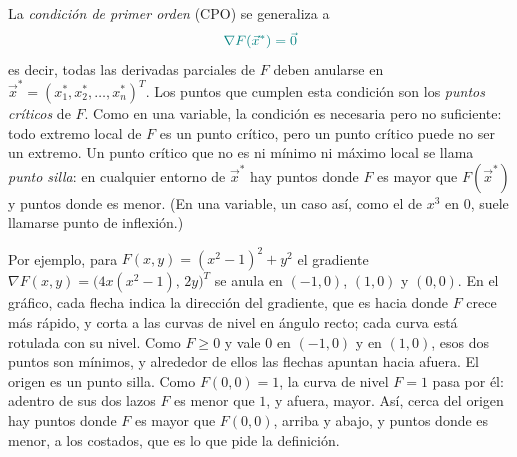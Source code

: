 \documentclass{article}
\newcommand{\vect}[1]{\vec{#1}}
\begin{document}
La \emph{condición de primer orden} (CPO) se generaliza a
\[\color{teal}
\nabla F(\vect{x}^*) = \vect{0}
\]
es decir, todas las derivadas parciales de \(F\) deben anularse en \(\vect{x}^* = (x^*_{1}, x^*_{2}, \dots, x^*_{n})^T\). Los puntos que cumplen esta condición son los \emph{puntos críticos} de \(F\). Como en una variable, la condición es necesaria pero no suficiente: todo extremo local de \(F\) es un punto crítico, pero un punto crítico puede no ser un extremo. Un punto crítico que no es ni mínimo ni máximo local se llama \emph{punto silla}: en cualquier entorno de \(\vect{x}^*\) hay puntos donde \(F\) es mayor que \(F(\vect{x}^*)\) y puntos donde es menor. (En una variable, un caso así, como el de \(x^3\) en \(0\), suele llamarse punto de inflexión.)

Por ejemplo, para \(F(x,y)=(x^2-1)^2+y^2\) el gradiente \(\nabla F(x,y)=\bigl(4x(x^2-1),\,2y\bigr)^T\) se anula en \((-1,0)\), \((1,0)\) y \((0,0)\). En el gráfico, cada flecha indica la dirección del gradiente, que es hacia donde \(F\) crece más rápido, y corta a las curvas de nivel en ángulo recto; cada curva está rotulada con su nivel. Como \(F\ge0\) y vale \(0\) en \((-1,0)\) y en \((1,0)\), esos dos puntos son mínimos, y alrededor de ellos las flechas apuntan hacia afuera. El origen es un punto silla. Como \(F(0,0)=1\), la curva de nivel \(F=1\) pasa por él: adentro de sus dos lazos \(F\) es menor que \(1\), y afuera, mayor. Así, cerca del origen hay puntos donde \(F\) es mayor que \(F(0,0)\), arriba y abajo, y puntos donde es menor, a los costados, que es lo que pide la definición.
\end{document}
